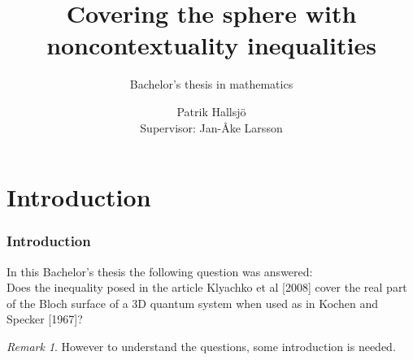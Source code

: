 \documentclass[•]{beamer}
\title{Covering the sphere with noncontextuality
inequalities}
\subtitle{Bachelor's thesis in mathematics}
\author{Patrik Hallsj\"{o} \\ Supervisor: Jan-\AA ke Larsson}
\date{}
\theoremstyle{remark}
\newtheorem{remark}[theorem]{Remark}
\begin{document}
\begin{frame}
\titlepage
\end{frame}
\section{Introduction}
\begin{frame}[shrink=10]\frametitle{Introduction}
\begin{block}

In this Bachelor's thesis the following question was answered:\\
Does the inequality posed in the article Klyachko et al [2008] cover the real
part of the Bloch surface of a 3D quantum system when used as in Kochen
and Specker [1967]?
\end{block}
\pause
\begin{remark}
However to understand the questions, some introduction is needed.
\end{remark}
\end{frame}
\end{document}
